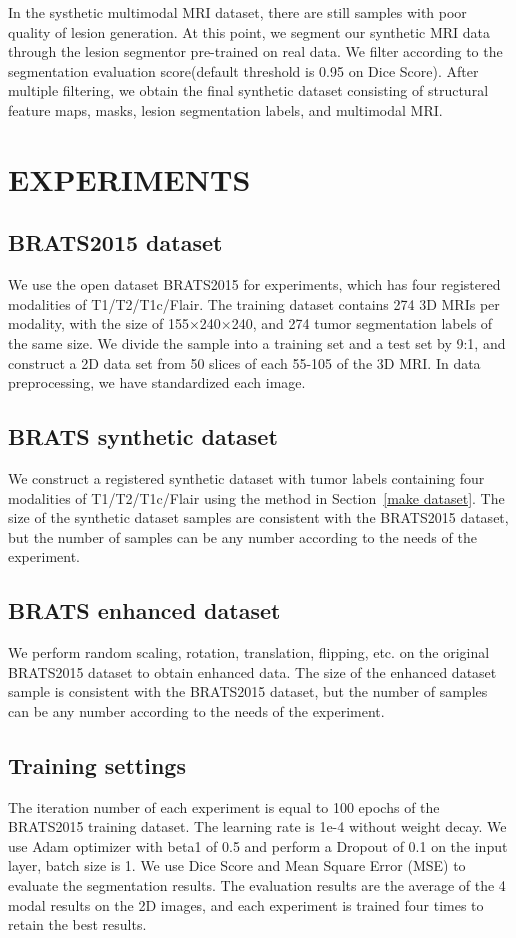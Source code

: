 \documentclass{ecai}
\begin{document}
In the systhetic multimodal MRI dataset, there are still samples with poor quality of lesion generation. At this point, we segment our synthetic MRI data through the lesion segmentor pre-trained on real data. We filter according to the segmentation evaluation score(default threshold is 0.95 on Dice Score). After multiple filtering, we obtain the final synthetic dataset consisting of structural feature maps, masks, lesion segmentation labels, and multimodal MRI.

\section{EXPERIMENTS}

\subsection{BRATS2015 dataset}
We use the open dataset BRATS2015\cite{91menze:hal-00935640} for experiments, which has four registered modalities of T1/T2/T1c/Flair. The training dataset contains 274 3D MRIs per modality, with the size of 155$\times$240$\times$240, and 274 tumor segmentation labels of the same size. We divide the sample into a training set and a test set by 9:1, and construct a 2D data set from 50 slices of each 55-105 of the 3D MRI. In data preprocessing, we have standardized each image.

\subsection{BRATS synthetic dataset}
We construct a registered synthetic dataset with tumor labels containing four modalities of T1/T2/T1c/Flair using the method in Section~\ref{make dataset}. The size of the synthetic dataset samples are consistent with the BRATS2015 dataset, but the number of samples can be any number according to the needs of the experiment.

\subsection{BRATS enhanced dataset}
We perform random scaling, rotation, translation, flipping, etc. on the original BRATS2015 dataset to obtain enhanced data. The size of the enhanced dataset sample is consistent with the BRATS2015 dataset, but the number of samples can be any number according to the needs of the experiment.

\subsection{Training settings}
The iteration number of each experiment is equal to 100 epochs of the BRATS2015 training dataset. The learning rate is 1e-4 without weight decay. We use Adam optimizer with beta1 of 0.5 and perform a Dropout of 0.1 on the input layer, batch size is 1. We use Dice Score \cite{95dice1945measures} and Mean Square Error (MSE)\cite{94prasad1990the} to evaluate the segmentation results. The evaluation results are the average of the 4 modal results on the 2D images, and each experiment is trained four times to retain the best results.
\end{document}
